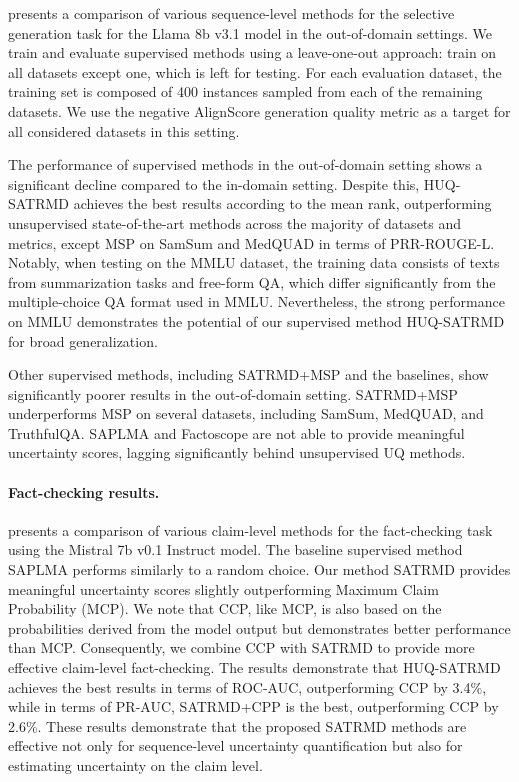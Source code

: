 \documentclass[11pt]{article}
\begin{document}
   presents a comparison of various sequence-level methods for the selective generation task for the Llama 8b v3.1 model in the out-of-domain settings. We train and evaluate supervised methods using a leave-one-out approach: train on all datasets except one, which is left for testing.
  For each evaluation dataset, the training set is composed of 400 instances sampled from each of the remaining datasets. We use the negative AlignScore generation quality metric as a target for all considered datasets in this setting. 

  The performance of supervised methods in the out-of-domain setting shows a significant decline compared to the in-domain setting. Despite this, HUQ-SATRMD achieves the best results according to the mean rank, outperforming unsupervised state-of-the-art methods across the majority of datasets and metrics, except MSP on SamSum and MedQUAD in terms of PRR-ROUGE-L. Notably, when testing on the MMLU dataset, the training data consists of texts from summarization tasks and free-form QA, which differ significantly from the multiple-choice QA format used in MMLU. Nevertheless, the strong performance on MMLU demonstrates the potential of our supervised method HUQ-SATRMD for broad generalization.
  
  Other supervised methods, including SATRMD+MSP and the baselines, show significantly poorer results in the out-of-domain setting. SATRMD+MSP underperforms MSP on several datasets, including SamSum, MedQUAD, and TruthfulQA. SAPLMA and Factoscope are not able to provide meaningful uncertainty scores, lagging significantly behind unsupervised UQ methods.

\paragraph{Fact-checking results.}



   presents a comparison of various claim-level methods for the fact-checking task using the Mistral 7b v0.1 Instruct model. The baseline supervised method SAPLMA performs similarly to a random choice. Our method SATRMD provides meaningful uncertainty scores slightly outperforming Maximum Claim Probability (MCP). We note that CCP, like MCP, is also based on the probabilities derived from the model output but demonstrates better performance than MCP. Consequently, we combine CCP with SATRMD to provide more effective claim-level fact-checking. The results demonstrate that HUQ-SATRMD achieves the best results in terms of ROC-AUC, outperforming CCP by 3.4\%, while in terms of PR-AUC, SATRMD+CPP is the best, outperforming CCP by 2.6\%. These results demonstrate that the proposed SATRMD methods are effective not only for sequence-level uncertainty quantification but also for estimating uncertainty on the claim level.
\end{document}
